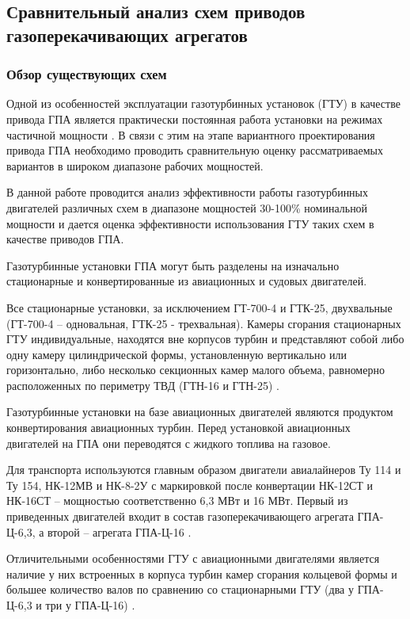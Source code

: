 \subsection{Сравнительный анализ схем приводов газоперекачивающих агрегатов}

\subsubsection{Обзор существующих схем}
Одной из особенностей эксплуатации газотурбинных установок (ГТУ) в качестве привода ГПА является практически постоянная
работа установки на режимах частичной мощности \cite{gtd_oil_and_gas}. В связи с этим на этапе вариантного проектирования
привода ГПА необходимо проводить сравнительную оценку рассматриваемых вариантов в широком диапазоне рабочих мощностей.

В данной работе проводится анализ эффективности работы газотурбинных двигателей различных схем в диапазоне мощностей
30-100\% номинальной мощности и дается оценка эффективности использования ГТУ таких схем в качестве приводов ГПА.

Газотурбинные установки ГПА могут быть разделены на изначально стационарные и конвертированные из авиационных и судовых двигателей.

Все стационарные установки, за исключением ГТ-700-4 и ГТК-25, двухвальные (ГТ-700-4 – одновальная, ГТК-25 - трехвальная).
Камеры сгорания стационарных ГТУ индивидуальные, находятся вне корпусов турбин и представляют собой либо одну камеру
цилиндрической формы, установленную вертикально или горизонтально, либо несколько секционных камер малого объема,
равномерно расположенных по периметру ТВД (ГТН-16 и ГТН-25) \cite{gtd_tomsk}.

Газотурбинные установки на базе авиационных двигателей являются продуктом конвертирования авиационных турбин. Перед
установкой авиационных двигателей на ГПА они переводятся с жидкого топлива на газовое.

Для транспорта используются главным образом двигатели авиалайнеров Ту 114 и Ту 154, НК-12МВ и НК-8-2У с маркировкой
после конвертации НК-12СТ и НК-16СТ – мощностью соответственно 6,3 МВт и 16 МВт. Первый из приведенных двигателей входит
в состав газоперекачивающего агрегата ГПА-Ц-6,3, а второй – агрегата ГПА-Ц-16 \cite{gtd_tomsk}.

Отличительными особенностями ГТУ с авиационными двигателями является наличие у них встроенных в корпуса турбин камер
сгорания кольцевой формы и большее количество валов по сравнению со стационарными ГТУ (два у ГПА-Ц-6,3 и три у ГПА-Ц-16) \cite{gtd_tomsk}.

